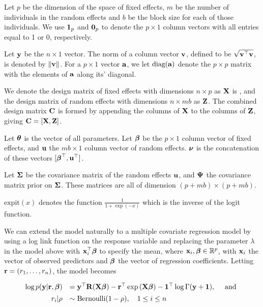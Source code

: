 Let $p$ be the dimension of the space of fixed effects, $m$ be the number of individuals in the random effects
and $b$ be the block size for each of those individuals. We use ${\bf 1}_p$ and ${\bf 0}_p$ to denote the $p
\times 1$ column vectors with all entries equal to 1 or 0, respectively.

Let ${\bf y}$ be the $n \times 1$ vector. The norm of a column vector ${\bf v}$, defined to be $\sqrt{{\bf v}^\top {\bf v}}$,
is  denoted by $\|{\bf v}\|$. For a $p \times 1$ vector ${\bf a}$, we let $\text{diag}{({\bf a})}$ denote the $p \times p$
matrix with the elements of ${\bf a}$ along its' diagonal.

We denote the design matrix of fixed effects with dimensions $n \times p$ as ${\bf X}$ is , and the design matrix
of random  effects with dimensions $n \times m b$ as ${\bf Z}$. The combined design matrix ${\bf C}$ is formed by
appending the columns of ${\bf X}$ to the columns of ${\bf Z}$, giving ${\bf C} = [ {\bf X}, {\bf Z} ]$.

Let ${\boldsymbol \theta}$ is the vector of all parameters.
Let ${\boldsymbol \beta}$ be the $p \times 1$ column vector of fixed
effects, and ${\bf u}$ the $m b \times 1$ column vector of random effects. ${\boldsymbol \nu}$ is the
concatenation of these vectors $[{\boldsymbol \beta}^\top, {\bf u}^\top]$.

Let ${\boldsymbol \Sigma}$ be the covariance matrix of the random effects ${\bf u}$,
and 
${\boldsymbol \Psi}$ the covariance matrix prior on ${\boldsymbol \Sigma}$.
These matrices are all of dimension $(p + m b) \times (p + m b)$.

$\text{expit}(x)$ denotes the function $\tfrac{1}{1 + \exp(-x)}$ which is the inverse of the logit
function.

We can extend the model naturally to a multiple covariate regression model by using a log link function on the
response variable and replacing the parameter $\lambda$ in the model above with ${\bf x}_i^\top {\boldsymbol\beta}$ to specify
the mean, where ${\bf x}_i,{\boldsymbol \beta} \in {\mathbb{R}}^p$, with ${\bf x}_i$ the vector of observed predictors and ${\boldsymbol \beta}$ the
vector of regression coefficients. Letting ${\bf r} = (r_1,\ldots,r_n)$, the model becomes

\begin{equation*}%
	\begin{array}{rl}
		\log p(\vy|\vr, \vbeta) 
		    & = \vy^\top \mR (\mX\vbeta)                           
		- \vr^\top \exp{(\mX\vbeta)} 
		- \vone^\top \log{\Gamma{(\vy + \vone)}}, \quad \mbox{ and }\\ [1ex]
		r_i | \rho & \sim \text{Bernoulli}(1-\rho), \quad 1 \leq i \leq n \\
	\end{array}
\end{equation*}

